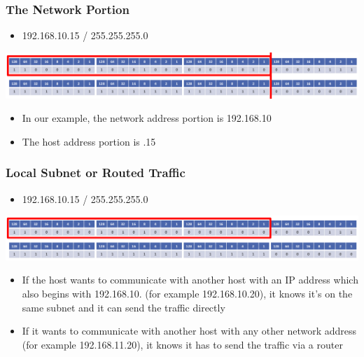 \documentclass[pdflatex,compress]{beamer}
\begin{document}
\begin{frame}
	\frametitle{The Network Portion}
	\begin{itemize}
		\item 192.168.10.15 / 255.255.255.0
	\end{itemize}
	\begin{center}
		\includegraphics[width=\linewidth]{img/img24}
	\end{center}
	\begin{itemize}
		\item In our example, the network address portion is 192.168.10
		\item The host address portion is .15
	\end{itemize}
\end{frame}

\begin{frame}
	\frametitle{Local Subnet or Routed Traffic}
	\begin{itemize}
		\item 192.168.10.15 / 255.255.255.0
	\end{itemize}
	\begin{center}
		\includegraphics[width=\linewidth]{img/img25}
	\end{center}
	\begin{itemize}
		\item If the host wants to communicate with another host with an IP address which also begins with 192.168.10. (for example 192.168.10.20), it knows it’s on the
		same subnet and it can send the traffic directly
		\item If it wants to communicate with another host with any other network address (for example 192.168.11.20), it knows it has to send the traffic via a router
	\end{itemize}
\end{frame}
\end{document}

